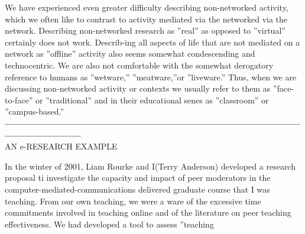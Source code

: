 \documentclass[8pt]{beamer}
\begin{document}
\begin{frame}
\small{ \hspace*{0.4cm} We have experienced even greater difficulty describing non-networked activity, which we often like to contrast to activity mediated via the networked via the network. Describing non-networked research as ''real'' as opposed to ''virtual'' certainly does not work. Describ-ing all aspects of life that are not mediated on a network as ''offline'' activity also seems somewhat condescending and technocentric. We are also not comfortable with the somewhat derogatory reference to humans as ''wetware,'' ''meatware,''or ''liveware.'' Thus, when we are discussing non-networked activity or contexts we usually refer to them as ''face-to-face'' or ''traditional'' and in their educational senes as ''classroom'' or ''campus-based.''\\
}
\vspace*{0.6cm}
\textbf{---------------------------------------------------------------------------------------------------------------------}\\
\large{
AN e-RESEARCH EXAMPLE
}

\vspace*{0.3cm}
\small{ In the winter of 2001, Liam Rourke and I(Terry Anderson) developed a research proposal ti investigate the capacity and impact of peer moderators in the computer-mediated-communications delivered graduate course that I was teaching. From our own teaching, we were a ware of the excessive time commitments involved in teaching online and of the literature on peer teaching effectiveness. We had developed a tool to assess ''teaching \\
}
\end{frame}
\end{document}

